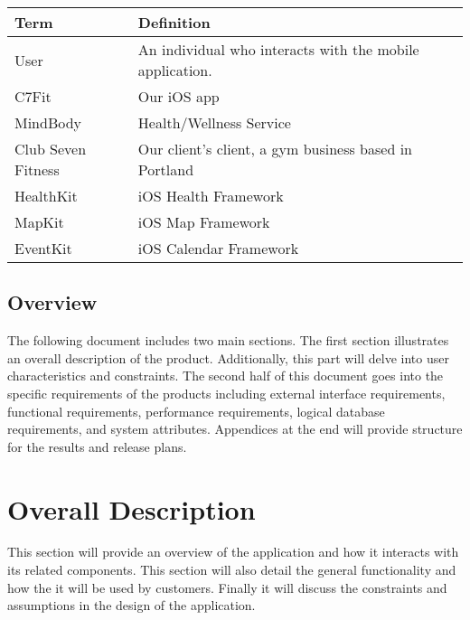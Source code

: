 \documentclass[letterpaper,10pt,titlepage]{article}
\begin{document}
\begin{center}
    \begin{tabular}{ | l | l | p{5cm} |}
    \hline
Term               & Definition                                               \\ \hline
User               & An individual who interacts with the mobile application. \\ \hline
C7Fit              & Our iOS app                                              \\ \hline
MindBody           & Health/Wellness Service                                  \\ \hline
Club Seven Fitness & Our client's client, a gym business based in Portland    \\ \hline
HealthKit          & iOS Health Framework                                     \\ \hline
MapKit             & iOS Map Framework                                        \\ \hline
EventKit           & iOS Calendar Framework                                   \\
    \hline
    \end{tabular}
\end{center}

\subsection{Overview}

The following document includes two main sections. The first section illustrates an overall description of the product. Additionally, this part will delve into user characteristics and constraints. The second half of this document goes into the specific requirements of the products including external interface requirements, functional requirements, performance requirements, logical database requirements, and system attributes. Appendices at the end will provide structure for the results and release plans.

\section{Overall Description}

This section will provide an overview of the application and how it interacts with its related components. This section will also detail the general functionality and how the it will be used by customers. Finally it will discuss the constraints and assumptions in the design of the application.
\end{document}
